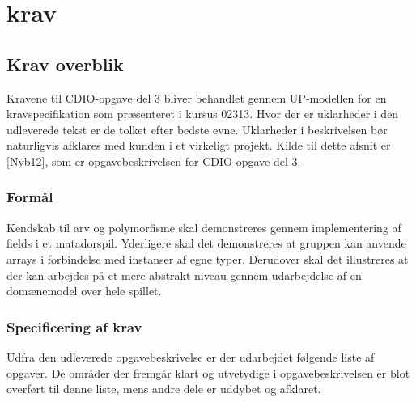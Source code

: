 \chapter{krav}\label{chap:krav}

\section{Krav overblik}\label{sec:krav:kravOverblik}
Kravene til CDIO-opgave del 3 bliver behandlet gennem UP-modellen for en kravspecifikation som præsenteret i kursus 02313. Hvor der er uklarheder i den udleverede tekst er de tolket efter bedste evne. Uklarheder i beskrivelsen bør naturligvis afklares med kunden i et virkeligt projekt. Kilde til dette afsnit er [Nyb12], som er opgavebeskrivelsen for CDIO-opgave del 3.

\subsection{Formål}\label{sec:krav:formål}
Kendskab til arv og polymorfisme skal demonstreres gennem implementering af fields i et matadorspil. Yderligere skal det demonstreres at gruppen kan anvende arrays i forbindelse med instanser af egne typer. Derudover skal det illustreres at der kan arbejdes på et mere abstrakt niveau gennem udarbejdelse af en domænemodel over hele spillet. 

\subsection{Specificering af krav}\label{sec:krav:kravSpec}
Udfra den udleverede opgavebeskrivelse \cite{Nyb12}  er der udarbejdet følgende liste af opgaver. De områder der fremgår klart og utvetydige i opgavebeskrivelsen er blot overført til denne liste, mens andre dele er uddybet og afklaret.

